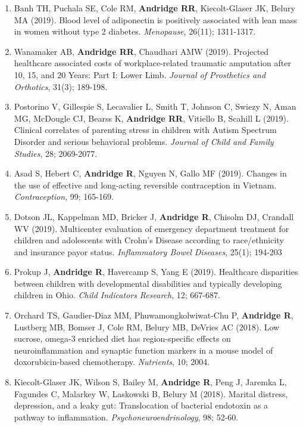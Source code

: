 \documentclass[
  english,
  letterpaper,
  DIV=11,
  numbers=noendperiod]{scrartcl}
\begin{document}
\begin{enumerate}
  \emph{Nutrients}, 11; 1589.
\item
  Banh TH, Puchala SE, Cole RM, \textbf{Andridge RR}, Kiecolt-Glaser JK,
  Belury MA (2019). Blood level of adiponectin is positively associated
  with lean mass in women without type 2 diabetes. \emph{Menopause},
  26(11); 1311-1317.
\item
  Wanamaker AB, \textbf{Andridge RR}, Chaudhari AMW (2019). Projected
  healthcare associated costs of workplace-related traumatic amputation
  after 10, 15, and 20 Years: Part I: Lower Limb. \emph{Journal of
  Prosthetics and Orthotics}, 31(3); 189-198.
\item
  Postorino V, Gillespie S, Lecavalier L, Smith T, Johnson C, Swiezy N,
  Aman MG, McDougle CJ, Bearss K, \textbf{Andridge RR}, Vitiello B,
  Scahill L (2019). Clinical correlates of parenting stress in children
  with Autism Spectrum Disorder and serious behavioral problems.
  \emph{Journal of Child and Family Studies}, 28; 2069-2077.
\item
  Asad S, Hebert C, \textbf{Andridge R}, Nguyen N, Gallo MF (2019).
  Changes in the use of effective and long-acting reversible
  contraception in Vietnam. \emph{Contraception}, 99; 165-169.
\item
  Dotson JL, Kappelman MD, Bricker J, \textbf{Andridge R}, Chisolm DJ,
  Crandall WV (2019). Multicenter evaluation of emergency department
  treatment for children and adolescents with Crohn's Disease according
  to race/ethnicity and insurance payor status. \emph{Inflammatory Bowel
  Diseases}, 25(1); 194-203
\item
  Prokup J, \textbf{Andridge R}, Havercamp S, Yang E (2019). Healthcare
  disparities between children with developmental disabilities and
  typically developing children in Ohio. \emph{Child Indicators
  Research}, 12; 667-687.
\item
  Orchard TS, Gaudier-Diaz MM, Phuwamongkolwiwat-Chu P, \textbf{Andridge
  R}, Lustberg MB, Bomser J, Cole RM, Belury MB, DeVries AC (2018). Low
  sucrose, omega-3 enriched diet has region-specific effects on
  neuroinflammation and synaptic function markers in a mouse model of
  doxorubicin-based chemotherapy. \emph{Nutrients}, 10; 2004.
\item
  Kiecolt-Glaser JK, Wilson S, Bailey M, \textbf{Andridge R}, Peng J,
  Jaremka L, Fagundes C, Malarkey W, Laskowski B, Belury M (2018).
  Marital distress, depression, and a leaky gut: Translocation of
  bacterial endotoxin as a pathway to inflammation.
  \emph{Psychoneuroendrinology}, 98; 52-60.

\end{enumerate}
\end{document}
